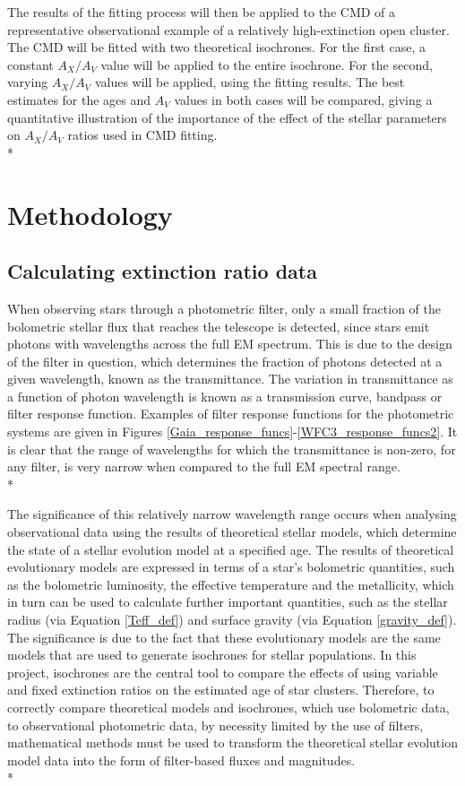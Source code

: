 \documentclass[12pt, a4paper]{report}
\begin{document}
The results of the fitting process will then be applied to the CMD of a representative observational example of a relatively high-extinction open cluster. The CMD will be fitted with two theoretical isochrones. For the first case, a constant $A_{X}/A_{V}$ value will be applied to the entire isochrone. For the second, varying $A_{X}/A_{V}$ values will be applied, using the fitting results. The best estimates for the ages and $A_{V}$ values in both cases will be compared, giving a quantitative illustration of the importance of the effect of the stellar parameters on $A_{X}/A_{V}$ ratios used in CMD fitting.\\*



\chapter{Methodology}

\section{Calculating extinction ratio data}

When observing stars through a photometric filter, only a small fraction of the bolometric stellar flux that reaches the telescope is detected, since stars emit photons with wavelengths across the full EM spectrum. This is due to the design of the filter in question, which determines the fraction of photons detected at a given wavelength, known as the transmittance. The variation in transmittance as a function of photon wavelength is known as a transmission curve, bandpass or filter response function. Examples of filter response functions for the photometric systems are given in Figures \ref{Gaia_response_funcs}-\ref{WFC3_response_funcs2}. It is clear that the range of wavelengths for which the transmittance is non-zero, for any filter, is very narrow when compared to the full EM spectral range.\\* 

The significance of this relatively narrow wavelength range occurs when analysing observational data using the results of theoretical stellar models, which determine the state of a stellar evolution model at a specified age. The results of theoretical evolutionary models are expressed in terms of a star's bolometric quantities, such as the bolometric luminosity, the effective temperature and the metallicity, which in turn can be used to calculate further important quantities, such as the stellar radius (via Equation \ref{Teff_def}) and surface gravity (via Equation \ref{gravity_def}). The significance is due to the fact that these evolutionary models are the same models that are used to generate isochrones for stellar populations. In this project, isochrones are the central tool to compare the effects of using variable and fixed extinction ratios on the estimated age of star clusters. Therefore, to correctly compare theoretical models and isochrones, which use bolometric data, to observational photometric data, by necessity limited by the use of filters, mathematical methods must be used to transform the theoretical stellar evolution model data into the form of filter-based fluxes and magnitudes.\\*
\end{document}
